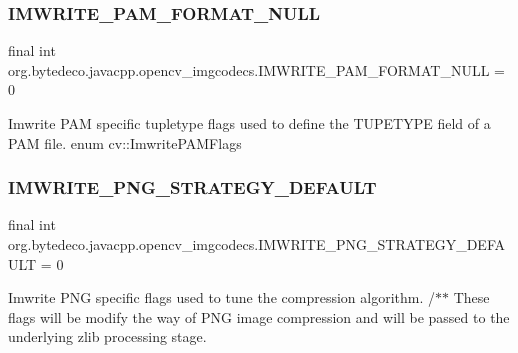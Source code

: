 \subsubsection{\texorpdfstring{I\+M\+W\+R\+I\+T\+E\+\_\+\+P\+A\+M\+\_\+\+F\+O\+R\+M\+A\+T\+\_\+\+N\+U\+LL}{IMWRITE\_PAM\_FORMAT\_NULL}}
{\footnotesize\ttfamily final int org.\+bytedeco.\+javacpp.\+opencv\+\_\+imgcodecs.\+I\+M\+W\+R\+I\+T\+E\+\_\+\+P\+A\+M\+\_\+\+F\+O\+R\+M\+A\+T\+\_\+\+N\+U\+LL = 0\hspace{0.3cm}{\ttfamily [static]}}

Imwrite P\+AM specific tupletype flags used to define the \textquotesingle{}T\+U\+P\+E\+T\+Y\+PE\textquotesingle{} field of a P\+AM file. enum cv\+::\+Imwrite\+P\+A\+M\+Flags \mbox{\label{group__imgcodecs_gabb28172fadcb5118b62c1e96ce65d7bd}} 
\subsubsection{\texorpdfstring{I\+M\+W\+R\+I\+T\+E\+\_\+\+P\+N\+G\+\_\+\+S\+T\+R\+A\+T\+E\+G\+Y\+\_\+\+D\+E\+F\+A\+U\+LT}{IMWRITE\_PNG\_STRATEGY\_DEFAULT}}
{\footnotesize\ttfamily final int org.\+bytedeco.\+javacpp.\+opencv\+\_\+imgcodecs.\+I\+M\+W\+R\+I\+T\+E\+\_\+\+P\+N\+G\+\_\+\+S\+T\+R\+A\+T\+E\+G\+Y\+\_\+\+D\+E\+F\+A\+U\+LT = 0\hspace{0.3cm}{\ttfamily [static]}}

Imwrite P\+NG specific flags used to tune the compression algorithm. /$\ast$$\ast$ These flags will be modify the way of P\+NG image compression and will be passed to the underlying zlib processing stage. 


